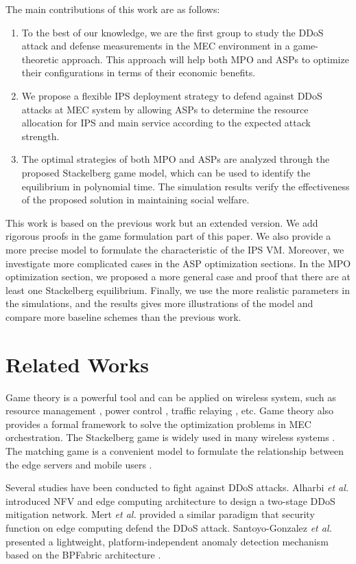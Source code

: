 \documentclass[conference]{IEEEtran}
\begin{document}
The main contributions of this work are as follows:
\begin{enumerate}
    \item To the best of our knowledge, we are the first group to study the DDoS attack and defense measurements in the MEC environment in a game-theoretic approach. This approach will help both MPO and ASPs to optimize their configurations in terms of their economic benefits.
    \item We propose a flexible IPS deployment strategy to defend against DDoS attacks at MEC system by allowing ASPs to determine the resource allocation for IPS and main service according to the expected attack strength. 
    \item The optimal strategies of both MPO and ASPs are analyzed through the proposed Stackelberg game model, which can be used to identify the equilibrium in polynomial time. The simulation results verify the effectiveness of the proposed solution in maintaining social welfare. 
\end{enumerate}

This work is based on the previous work \cite{Chang2} but an extended version. We add rigorous proofs in the game formulation part of this paper. We also provide a more precise model to formulate the characteristic of the IPS VM. Moreover, we investigate more complicated cases in the ASP optimization sections. In the MPO optimization section, we proposed a more general case and proof that there are at least one Stackelberg equilibrium. Finally, we use the more realistic parameters in the simulations, and the results gives more illustrations of the model and compare more baseline schemes than the previous work.

\section{Related Works}
Game theory is a powerful tool and can be applied on wireless system, such as resource management \cite{Xu} \cite{Chen2}, power control \cite{Li3} \cite{Zhao}, traffic relaying \cite{Li4}, etc. Game theory also provides a formal framework to solve the optimization problems in MEC orchestration. The Stackelberg game is widely used in many wireless systems \cite{Chang} \cite{Wang2} \cite{Lin2} \cite{Yu}. The matching game is a convenient model to formulate the relationship between the edge servers and mobile users \cite{Liu2} \cite{Lin} \cite{Zhang2}. 

Several studies have been conducted to fight against DDoS attacks.  Alharbi \emph{et al.} introduced NFV and edge computing architecture to design a two-stage DDoS mitigation network\cite{Alharbi}. Mert \emph{et al.}  provided a similar paradigm that security function on edge computing defend the DDoS attack\cite{Mert}. Santoyo-Gonzalez \emph{et al.} presented a lightweight, platform-independent anomaly
detection mechanism based on the BPFabric architecture \cite{Santoyo-Gonzalez}. 
\end{document}
